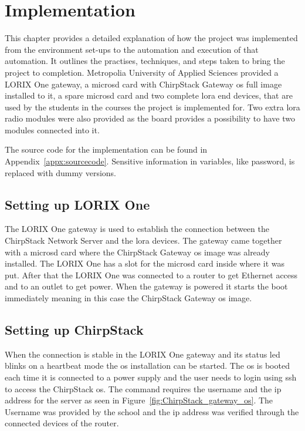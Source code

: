 
\chapter{Implementation} \label{ch:impl}
This chapter provides a detailed explanation of how the project was implemented from the environment set-ups to the automation and execution of that automation.
It outlines the practises, techniques, and steps taken to bring the project to completion.
Metropolia University of Applied Sciences provided a LORIX One gateway, a micro\gls{sd} card with ChirpStack Gateway \gls{os} full image installed to it, a spare micro\gls{sd} card and two complete \gls{lora} end devices, that are used by the students in the courses the project is implemented for. Two extra \gls{lora} radio modules were also provided as the board provides a possibility to have two modules connected into it.

The source code for the implementation can be found in Appendix~\ref{appx:sourcecode}.
Sensitive information in variables, like password, is replaced with dummy versions.

\section{Setting up LORIX One}
The LORIX One gateway is used to establish the connection between the ChirpStack Network Server and the \gls{lora} devices.
The gateway came together with a micro\gls{sd} card where the ChirpStack Gateway \gls{os} image was already installed.
The LORIX One has a slot for the micro\gls{sd} card inside where it was put.
After that the LORIX One was connected to a router to get Ethernet access and to an outlet to get power.
When the gateway is powered it starts the boot immediately meaning in this case the ChirpStack Gateway \gls{os} image.

\clearpage

\section{Setting up ChirpStack}
When the connection is stable in the LORIX One gateway and its status led blinks on a heartbeat mode the \gls{os} installation can be started.
The \gls{os} is booted each time it is connected to a power supply and the user needs to login using \gls{ssh} to access the ChirpStack \gls{os}\cite{chirpstack:gettingStarted}.
The command requires the username and the \gls{ip} address for the server as seen in Figure~\ref{fig:ChirpStack_gateway_os}.
The Username was provided by the school and the \gls{ip} address was verified through the connected devices of the router.

